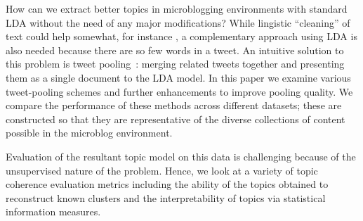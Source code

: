 \documentclass[10pt,a5paper,twoside]{article}
\begin{document}
How can we extract better topics in
microblogging environments with standard LDA without the need of any
major modifications?  
While lingistic ``cleaning'' of text could help somewhat,
for instance  \cite{Han2012},  a complementary approach 
using LDA is also needed because there are so few words in a tweet.
An intuitive solution to this problem is tweet
pooling~\cite{Weng2010wsdm,hong}: merging related tweets together and presenting them as a
single document to the LDA model.  
In this paper we examine various tweet-pooling schemes and further 
enhancements to improve pooling quality.  We compare
the performance of these methods across different datasets; these are
constructed so that they are representative of the diverse collections
of content possible in the microblog environment.  

Evaluation of the resultant topic model on this data is challenging
because of the unsupervised nature of the problem.  Hence, we look at
a variety of topic coherence evaluation metrics including the ability
of the topics obtained to reconstruct known clusters and
the interpretability of topics via statistical information measures.

%
\end{document}
